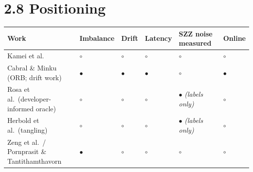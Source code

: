 \section{2.8 Positioning}\label{positioning}

\begin{longtable}[]{@{}
  >{\raggedright\arraybackslash}p{}
  >{\raggedright\arraybackslash}p{}
  >{\raggedright\arraybackslash}p{}
  >{\raggedright\arraybackslash}p{}
  >{\raggedright\arraybackslash}p{}
  >{\raggedright\arraybackslash}p{}@{}}
\toprule\noalign{}
\begin{minipage}[b]{\linewidth}\raggedright
Work
\end{minipage} & \begin{minipage}[b]{\linewidth}\raggedright
Imbalance
\end{minipage} & \begin{minipage}[b]{\linewidth}\raggedright
Drift
\end{minipage} & \begin{minipage}[b]{\linewidth}\raggedright
Latency
\end{minipage} & \begin{minipage}[b]{\linewidth}\raggedright
SZZ noise \textbf{measured}
\end{minipage} & \begin{minipage}[b]{\linewidth}\raggedright
Online
\end{minipage} \\
\midrule\noalign{}
\endhead
\bottomrule\noalign{}
\endlastfoot
Kamei et al. & \ensuremath{\circ} & \ensuremath{\circ} & \ensuremath{\circ} & \ensuremath{\circ} & \ensuremath{\circ} \\
Cabral \& Minku (ORB; drift work) & \ensuremath{\bullet} & \ensuremath{\bullet} & \ensuremath{\bullet} & \ensuremath{\circ} & \ensuremath{\bullet} \\
Rosa et al.~(developer-informed oracle) & \ensuremath{\circ} & \ensuremath{\circ} & \ensuremath{\circ} & \ensuremath{\bullet} \emph{(labels
only)} & \ensuremath{\circ} \\
Herbold et al.~(tangling) & \ensuremath{\circ} & \ensuremath{\circ} & \ensuremath{\circ} & \ensuremath{\bullet} \emph{(labels only)} & \ensuremath{\circ} \\
Zeng et al.~/ Pornprasit \& Tantithamthavorn & \ensuremath{\bullet} & \ensuremath{\circ} & \ensuremath{\circ} & \ensuremath{\circ} & \ensuremath{\circ} \\

\end{longtable}
